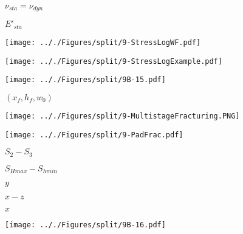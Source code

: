\documentclass[onecolumn,11pt]{report}
\def\lthtmlcheckvsize{\ifdim\ht\sizebox<\vsize 
  \ifdim\wd\sizebox<\hsize\expandafter\hfill\fi \expandafter\vfill
  \else\expandafter\vss\fi}%
\begin{document}
{\newpage\clearpage
{}%
$ \nu_{sta}=\nu_{dyn}$%
\lthtmlindisplaymathZ
\lthtmlcheckvsize\clearpage}

{\newpage\clearpage
{}%
$ E'_{sta}$%
\lthtmlindisplaymathZ
\lthtmlcheckvsize\clearpage}

{\newpage\clearpage
{}%
\texttt{[image: .././Figures/split/9-StressLogWF.pdf]}%
\lthtmlpictureZ
\lthtmlcheckvsize\clearpage}

{\newpage\clearpage
{}%
\texttt{[image: .././Figures/split/9-StressLogExample.pdf]}%
\lthtmlpictureZ
\lthtmlcheckvsize\clearpage}

{\newpage\clearpage
{}%
\texttt{[image: .././Figures/split/9B-15.pdf]}%
\lthtmlpictureZ
\lthtmlcheckvsize\clearpage}

{\newpage\clearpage
{}%
$ (x_f, h_f, w_0)$%
\lthtmlindisplaymathZ
\lthtmlcheckvsize\clearpage}

{\newpage\clearpage
{}%
\texttt{[image: .././Figures/split/9-MultistageFracturing.PNG]}%
\lthtmlpictureZ
\lthtmlcheckvsize\clearpage}

{\newpage\clearpage
{}%
\texttt{[image: .././Figures/split/9-PadFrac.pdf]}%
\lthtmlpictureZ
\lthtmlcheckvsize\clearpage}

{\newpage\clearpage
{}%
$ S_2-S_3$%
\lthtmlindisplaymathZ
\lthtmlcheckvsize\clearpage}

{\newpage\clearpage
{}%
$ S_{Hmax}-S_{hmin}$%
\lthtmlindisplaymathZ
\lthtmlcheckvsize\clearpage}

{\newpage\clearpage
{}%
$ y$%
\lthtmlindisplaymathZ
\lthtmlcheckvsize\clearpage}

{\newpage\clearpage
{}%
$ x-z$%
\lthtmlindisplaymathZ
\lthtmlcheckvsize\clearpage}

{\newpage\clearpage
{}%
$ x$%
\lthtmlindisplaymathZ
\lthtmlcheckvsize\clearpage}

{\newpage\clearpage
{}%
\texttt{[image: .././Figures/split/9B-16.pdf]}%
\lthtmlpictureZ
\lthtmlcheckvsize\clearpage}
\end{document}
